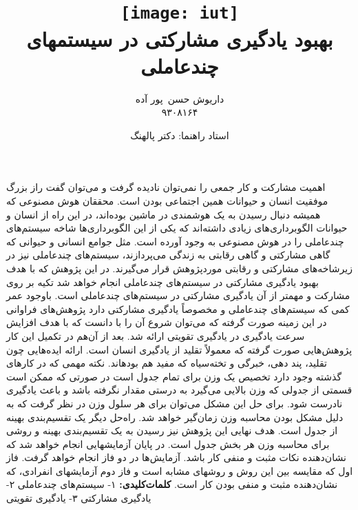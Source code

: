\documentclass[12pt,a4paper]{article}
\begin{document}
\title{
    \texttt{[image: iut]}\\\vspace{20pt}
    بهبود یادگیری مشارکتی در سیستمهای چندعاملی\\
}
\author{
داریوش حسن\ پور آده\\
۹۳۰۸۱۶۴
}
\date{استاد راهنما: دکتر پالهنگ}
\maketitle

اهمیت مشارکت و کار جمعی را نمی‌توان نادیده گرفت و می‌توان گفت راز بزرگ موفقیت انسان و حیوانات همین اجتماعی
بودن است. محققان هوش مصنوعی که همیشه دنبال رسیدن به یک هوشمندی در ماشین بوده‌اند، در این راه از انسان و حیوانات
الگوبرداری‌های زیادی داشته‌اند که یکی از این الگوبرداری‌ها شاخه سیستم‌های چندعاملی را در هوش مصنوعی به وجود آورده
است. مثل جوامع انسانی و حیوانی که گاهی مشارکتی و گاهی رقابتی به زندگی می‌پردازند، سیستم‌های چندعاملی نیز در
زیرشاخه‌های مشارکتی و رقابتی موردپژوهش قرار می‌گیرند. در این پژوهش که با هدف بهبود یادگیری مشارکتی در سیستم‌های
چندعاملی انجام خواهد شد تکیه‌ بر روی مشارکت و مهمتر از آن یادگیری مشارکتی در سیستم‌های چندعاملی است.
باوجود عمر کمی که سیستم‌های چندعاملی و مخصوصاً یادگیری مشارکتی دارد پژوهش‌های فراوانی در این زمینه صورت
گرفته که می‌توان شروع آن را با  دانست که با هدف افزایش سرعت یادگیری در یادگیری تقویتی ارائه شد. بعد از آن‌هم
در تکمیل این کار پژوهش‌هایی صورت گرفته که معمولاً تقلید از یادگیری انسان است. ارائه ایده‌هایی چون تقلید، پند دهی، خبرگی
و تخته‌سیاه که مفید هم بودهاند. نکته مهمی که در کارهای گذشته وجود دارد تخصیص یک وزن برای تمام جدول است در صورتی
که ممکن است قسمتی از جدولی که وزن بالایی می‌گیرد به درستی مقدار نگرفته باشد و باعث یادگیری نادرست شود. برای حل
این مشکل می‌توان برای هر سلول وزن در نظر گرفت که به دلیل مشکل بودن محاسبه وزن زمان‌گیر خواهد شد. راه‌حل دیگر یک
تقسیم‌بندی بهینه از جدول است. هدف نهایی این پژوهش نیز رسیدن به یک تقسیم‌بندی بهینه و روشی برای محاسبه وزن هر بخش
جدول است.
در پایان آزمایشهایی انجام خواهد شد که نشان‌دهنده نکات مثبت و منفی کار باشد. آزمایش‌ها در دو فاز انجام خواهد
گرفت. فاز اول که مقایسه بین این روش و روشهای مشابه است و فاز دوم آزمایشهای انفرادی، که نشان‌دهنده مثبت و منفی بودن
کار است.
\vspace{1em}
\noindent\textbf{کلمات‌کلیدی:} ۱- سیستم‌های چندعاملی ۲- یادگیری مشارکتی ۳- یادگیری تقویتی
\end{document}
